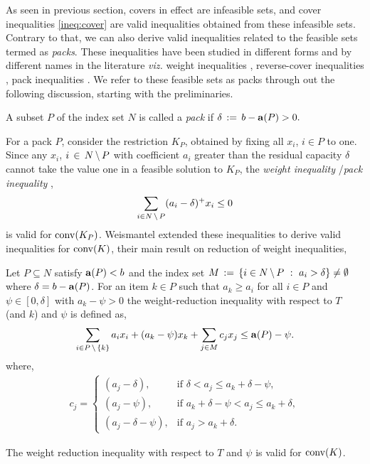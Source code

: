 \documentclass[10pt,twoside]{amsart}
\begin{document}
\label{sec:pack}
As seen in previous section, covers in effect are infeasible sets, and cover inequalities \eqref{ineq:cover} are valid inequalities obtained from these infeasible sets. Contrary to that, we can also derive valid inequalities related to the feasible sets termed as \textit{packs}. These inequalities have been studied in different forms and by different names in the literature \textit{viz.} weight inequalities \cite{Weismantel97}, reverse-cover inequalities \cite{Marchand99}, pack inequalities \cite{Atamturk2005}. We refer to these feasible sets as packs through out the following discussion, starting with the preliminaries.

\begin{dfn}
  A subset $P$ of the index set $N$ is called a \textit{pack} if $\delta \,:=\, b - \mathbf{a}(P) > 0.$
\end{dfn}

For a pack $P$, consider the restriction $K_P$, obtained by ﬁxing all $x_i$, $i \in P$ to one. Since any $x_i$, $i \,\in\, N \,\backslash\, P$ with coefficient $a_i$ greater than the residual capacity $\delta$ cannot take the value one in a feasible solution to $K_P$, the \textit{weight inequality} \cite{Weismantel97}/\textit{pack inequality} \cite{Atamturk2005},
\begin{align}
\label{ineq:weightineq}
    \sum_{i\in N\,\backslash\, P} (a_i - \delta)^+ x_i \leq 0
\end{align}
is valid for $\operatorname{conv}(K_P)$. Weismantel \cite{Weismantel97} extended these inequalities to derive valid inequalities for $\operatorname{conv}(K)$, their main result on reduction of weight inequalities,
\begin{prop}
  Let $P\subseteq N$ satisfy $\mathbf{a}(P) < b$ and the index set $M \,:=\, \left\{ {i\in N\,\backslash\, P} \ : \ {a_i > \delta} \right\} \neq \emptyset$ where $\delta = b - \mathbf{a}(P)$. For an item $k \in P$ such that $a_k \geq a_i$ for all $i \in P$ and $\psi \in [0,\delta]$ with $a_k - \psi > 0$ the weight-reduction inequality with respect to $T$ (and $k$) and $\psi$ is defined as,
  \begin{align}
    \sum_{i \in P\,\backslash\, \{k\}} a_ix_i + (a_k - \psi)x_k + \sum_{j \in M} c_j x_j \leq \mathbf{a}(P) - \psi.
  \end{align}
  where,
  \begin{align*}
    c_j =   \begin{cases}
              (a_j - \delta), & \mbox{if } \delta < a_j \leq a_k + \delta - \psi, \\
              (a_j - \psi), & \mbox{if } a_k + \delta - \psi < a_j \leq a_k + \delta, \\
              (a_j - \delta -\psi), & \mbox{if } a_j > a_k + \delta.
            \end{cases}
  \end{align*}

  The weight reduction inequality with respect to $T$ and $\psi$ is valid for $\operatorname{conv}(K)$.
\end{prop}
\end{document}

